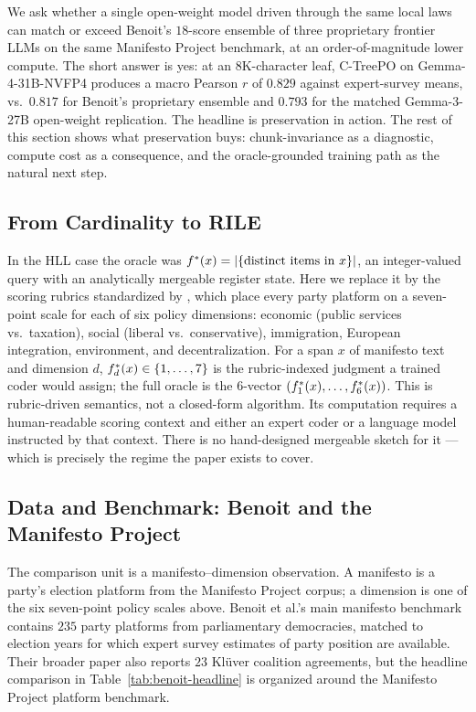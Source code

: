 We ask whether a single open-weight model driven through the same local laws can match or exceed Benoit's $18$-score ensemble of three proprietary frontier LLMs on the same Manifesto Project benchmark, at an order-of-magnitude lower compute. The short answer is yes: at an $8\mathrm{K}$-character leaf, C-TreePO on Gemma-4-31B-NVFP4 produces a macro Pearson $r$ of $0.829$ against expert-survey means, vs.\ $0.817$ for Benoit's proprietary ensemble and $0.793$ for the matched Gemma-3-27B open-weight replication. The headline is preservation in action. The rest of this section shows what preservation buys: chunk-invariance as a diagnostic, compute cost as a consequence, and the oracle-grounded training path as the natural next step.

\subsection{From Cardinality to RILE}

In the HLL case the oracle was
$f^\ast(x) = |\{\text{distinct items in } x\}|$, an integer-valued query
with an analytically mergeable register state. Here we replace it by
the scoring rubrics standardized by \citet{BenoitEtAl2025}, which place
every party platform on a seven-point scale for each of six policy
dimensions: economic (public services vs.\ taxation), social
(liberal vs.\ conservative), immigration, European integration,
environment, and decentralization. For a span $x$ of manifesto text and
dimension $d$, $f^\ast_d(x) \in \{1,\dots,7\}$ is the rubric-indexed
judgment a trained coder would assign; the full oracle is the $6$-vector
$(f^\ast_1(x),\dots,f^\ast_6(x))$. This is rubric-driven semantics, not
a closed-form algorithm. Its computation requires a human-readable
scoring context and either an expert coder or a language model
instructed by that context. There is no hand-designed mergeable sketch
for it --- which is precisely the regime the paper exists to cover.

\subsection{Data and Benchmark: Benoit and the Manifesto Project}

The comparison unit is a manifesto--dimension observation. A manifesto
is a party's election platform from the Manifesto Project corpus; a
dimension is one of the six seven-point policy scales above. Benoit et
al.'s main manifesto benchmark contains $235$ party platforms from
parliamentary democracies, matched to election years for which expert
survey estimates of party position are available. Their broader paper
also reports $23$ Kl\"uver coalition agreements, but the headline
comparison in Table~\ref{tab:benoit-headline} is organized around the
Manifesto Project platform benchmark.

